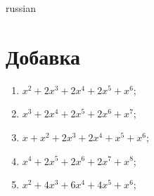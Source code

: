 \documentclass[20pt,a4paper]{book}
\begin{document}
\begin{otherlanguage*}{russian}
\newcommand{\HRule}{\rule{\linewidth}{0.5mm}}
\renewcommand{\chaptername}{Серия}

\setcounter{chapter}{3}

\chapter{Добавка}\begin{enumerate}
\item $x^2 + 2x^3 + 2x^4 + 2x^5 + x^6$;
\item $x^3 + 2x^4 + 2x^5 + 2x^6 + x^7$;
\item $x + x^2 + 2x^3 + 2x^4 + x^5 + x^6$;
\item $x^4 + 2x^5 + 2x^6 + 2x^7 + x^8$;
\item $x^2 + 4x^3 + 6x^4 + 4x^5 + x^6$;
\end{enumerate}
\end{otherlanguage*}
\end{document}
